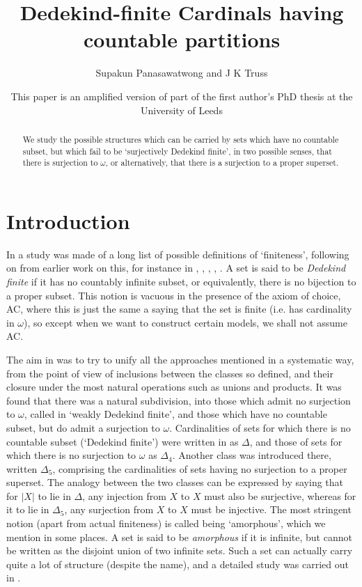 \documentclass[a4paper,reqno]{amsart}
\title{Dedekind-finite Cardinals having countable partitions}
\author{Supakun Panasawatwong and J K Truss}
\date{This paper is an amplified version of part of the first author's PhD thesis at the University of Leeds}%
\numberwithin{equation}{section}
\begin{document}
\begin{abstract} We study the possible structures which can be carried by sets which have no countable subset, 
but which fail to be `surjectively Dedekind finite', in two possible 
senses, that there is surjection to $\omega$, or alternatively, that there is a surjection to a proper superset.
\end{abstract}


\maketitle  

\setcounter{footnote}{1}


\section {Introduction}

In \cite{Panasawatwong} a study was made of a long list of possible definitions 
of `finiteness', following on from earlier work on this, for instance in \cite{Levy},
\cite{Truss1}, \cite{Truss3}, \cite{Degen}, \cite{Goldstern}. A set is said to be {\em Dedekind finite} 
if it has no countably infinite subset, or equivalently, there is no 
bijection to a proper subset. This notion is vacuous in the presence of the axiom of 
choice, AC, where this is just the same a saying that the set is finite 
(i.e. has cardinality in $\omega$), so except when we want to construct 
certain models, we shall not assume AC.

The aim in \cite{Panasawatwong} was to try to unify all the approaches mentioned in a systematic way, from the 
point of view of inclusions between the classes so defined, and their closure under the 
most natural operations such as unions and products. It was found that there was a natural 
subdivision, into those which admit no surjection to $\omega$, called in \cite{Walczak} 
`weakly Dedekind finite', and those which have no countable subset, but do admit a surjection
to $\omega$. Cardinalities of sets for which there is no countable subset (`Dedekind finite')
were written in \cite{Truss1} as $\Delta$, and those of sets for which there is no surjection 
to $\omega$ as $\Delta_4$. Another class was introduced there, written $\Delta_5$, comprising
the cardinalities of sets having no surjection to a proper superset. The analogy between the two classes
can be expressed by saying that for $|X|$ to lie in $\Delta$, any injection from $X$ to $X$ must 
also be surjective, whereas for it to lie in $\Delta_5$, any surjection from $X$ to $X$ must be 
injective. The most stringent notion (apart from actual finiteness) is called being `amorphous',
which we mention in some places. A set is said to be {\em amorphous} if it is infinite, but cannot be
written as the disjoint union of two infinite sets. Such a set can actually carry quite a lot of
structure (despite the name), and a detailed study was carried out in \cite{Truss3}.
\end{document}
